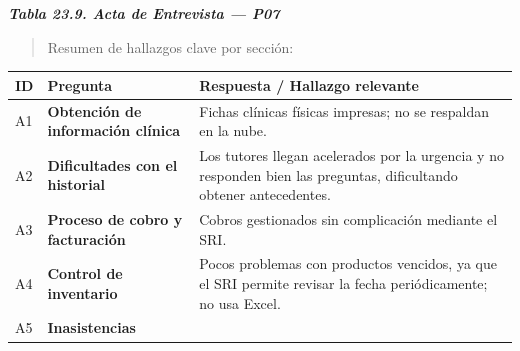 \documentclass[
]{article}
\newcounter{none} %
\begin{document}
\protect{}\label{_bookmark_P07_acta}{}\emph{\textbf{Tabla 23.9. Acta de Entrevista --- P07}}

\begin{quote}
Resumen de hallazgos clave por sección:
\end{quote}

{\def\LTcaptype{none} %
\begin{longtable}[]{|
  >{\centering\arraybackslash}p{}|
  >{\raggedright\arraybackslash}p{}|
  >{\raggedright\arraybackslash}p{}|}
\hline
\begin{minipage}[b]{\linewidth}\centering
\textbf{ID}
\end{minipage} & \begin{minipage}[b]{\linewidth}\centering
\textbf{Pregunta}
\end{minipage} & \begin{minipage}[b]{\linewidth}\raggedright
\textbf{Respuesta / Hallazgo relevante}
\end{minipage} \\
\hline
\endhead
\hline
\endlastfoot
A1 & \textbf{Obtención de información clínica} &
\begin{minipage}[t]{\linewidth}\raggedright
Fichas clínicas físicas impresas; no se respaldan en la nube.
\end{minipage} \\
\hline
A2 & \textbf{Dificultades con el historial} &
\begin{minipage}[t]{\linewidth}\raggedright
Los tutores llegan acelerados por la urgencia y no responden bien las preguntas, dificultando obtener antecedentes.
\end{minipage} \\
\hline
A3 & \textbf{Proceso de cobro y facturación} &
\begin{minipage}[t]{\linewidth}\raggedright
Cobros gestionados sin complicación mediante el SRI.
\end{minipage} \\
\hline
A4 & \textbf{Control de inventario} &
\begin{minipage}[t]{\linewidth}\raggedright
Pocos problemas con productos vencidos, ya que el SRI permite revisar la fecha periódicamente; no usa Excel.
\end{minipage} \\
\hline
A5 & \textbf{Inasistencias} &
\begin{minipage}[t]{\linewidth}\raggedright

\end{minipage}
\end{longtable}}
\end{document}
